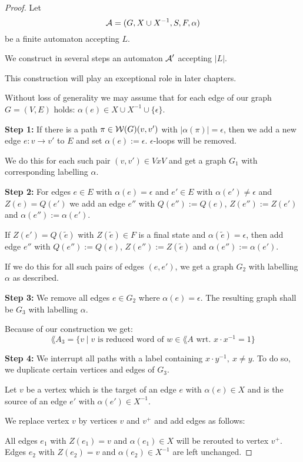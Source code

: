 \begin{proof}
Let \[ \mbox{$\mathcal{A}$} = (G, X \cup X^{-1}, S, F, \alpha) \] be a finite automaton
accepting $L$.

We construct in several steps an automaton $\mbox{$\mathcal{A}$}'$ accepting $|L|$.

This construction will play an exceptional role in later chapters.

Without loss of generality we may assume that for each edge of our graph $G =
(V, E)$ holds: $\alpha(e) \in X\cup X^{-1}\cup \{\epsilon\}$.

{\bf Step 1:} If there is a path $\pi \in \mbox{$\mathcal{W}(G)$}(v, v')$ with
$|\alpha(\pi)| = \epsilon$, then we add a new edge $e: v \to v'$ to $E$ and set
$\alpha(e) := \epsilon$. $\epsilon$-loops will be removed.

We do this for each such pair $(v, v')\in V x V$ and get a graph $G_1$ with
corresponding labelling $\alpha$.

{\bf Step 2:} For edges $e\in E$ with $\alpha(e) = \epsilon$ and $e'\in E$ with
$\alpha(e')\neq \epsilon$ and $Z(e) = Q(e')$ we add an edge $e''$ with
$Q(e'') := Q(e)$, $Z(e'') := Z(e')$ and $\alpha(e'') := \alpha(e')$.

If $Z(e') = Q(\tilde{e})$ with $Z(\tilde{e}) \in F$ is a final state and
$\alpha(\tilde{e}) = \epsilon$, then add edge $e''$ with $Q(e'') := Q(e)$,
$Z(e'') := Z(\tilde{e})$ and $\alpha(e'') := \alpha(e')$.


If we do this for all such pairs of edges $(e, e')$, we get a graph $G_2$ with
labelling $\alpha$ as described.

{\bf Step 3:} We remove all edges $e \in G_2$ where $\alpha(e) = \epsilon$. The
resulting graph shall be $G_3$ with labelling $\alpha$.

Because of our construction we get:
\[ \lang{A}_3 = \{ v \mid v \mbox{ is reduced word of } w \in
\lang{A} \mbox{ wrt. } x\cdot x^{-1} = 1 \} \]

{\bf Step 4:} We interrupt all paths with a label containing $x \cdot y^{-1},\
x\neq y$. To do so, we duplicate certain vertices and edges of $G_3$.

Let $v$ be a vertex which is the target of an edge $e$ with $\alpha(e) \in X$
and is the source of an edge $e'$ with $\alpha(e') \in X^{-1}$.

We replace vertex $v$ by vertices $v$ and $v^+$ and add edges as follows:

All edges $e_1$ with $Z(e_1) = v$ and $\alpha(e_1) \in X$ will be rerouted to
vertex $v^+$. Edges $e_2$ with $Z(e_2) = v$ and $\alpha(e_2) \in X^{-1}$ are
left unchanged.


\end{proof}
